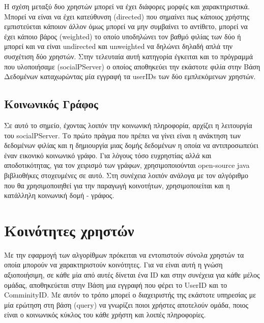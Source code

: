 Η σχέση μεταξύ δυο χρηστών μπορεί να έχει διάφορες μορφές και χαρακτηριστικά. Μπορεί να είναι να έχει κατεύθυνση (directed) που σημαίνει πως κάποιος χρήστης
εμπιστεύεται κάποιον άλλον όμως μπορεί να μην συμβαίνει το αντίθετο, μπορεί να έχει κάποιο βάρος (weighted) το οποίο υποδηλώνει τον βαθμό
φιλίας των δύο ή μπορεί και να είναι undirected και unweighted να δηλώνει δηλαδή απλά την συσχέτιση δύο χρηστών. Στην τελευταία αυτή κατηγορία
έγκειται και το πρόγραμμά που υλοποιήσαμε (socialPServer) ο οποίος αποθηκεύει την εκάστοτε φιλία στην Βάση Δεδομένων καταχωρώντας μία εγγραφή τα userIDs των δύο εμπλεκόμενων χρηστών.


\subsection*{Κοινωνικός Γράφος}
\noindent
Σε αυτό το σημείο, έχοντας λοιπόν την κοινωνική πληροφορία, αρχίζει η λειτουργία του socialPServer. Το πρώτο πράγμα που πρέπει να γίνει
είναι η ανάκτηση των δεδομένων φιλίας και η δημιουργία μιας δομής δεδομένων η οποία να αντιπροσωπεύει έναν εικονικό κοινωνικό γράφο.
Για λόγους τόσο ευχρηστίας αλλά και αποδοτικότητας, για τον χειρισμό των γράφων, χρησιμοποιούνται open-source java βιβλιοθήκες στοχευμένες σε αυτό. Στη συνέχεια λοιπόν
ανάλογα με τον αλγόριθμο που θα χρησιμοποιηθεί για την παραγωγή κοινοτήτων, χρησιμοποιείται και η κατάλληλη κοινωνική δομή - γράφος.



\section{Κοινότητες χρηστών}
\noindent
Με την εφαρμογή των αλγορίθμων πρόκειται να εντοπιστούν σύνολα χρηστών τα οποία μπορούν να χαρακτηριστούν κοινότητες. Για να είναι αυτή η γνώση αξιοποιήσιμη,
σε κάθε μία από αυτές δίνεται ένα ID και στην συνέχεια για κάθε μέλος ομάδας, αποθηκεύεται στην Βάση μια εγγραφή που φέρει το UserID και το ComminityID. Με αυτόν το τρόπο μπορεί ο διαχειριστής της εκάστοτε υπηρεσίας
με μία ερώτηση στη βάση (query) να γνωρίζει ποιοι χρήστες αποτελούν ομάδα, ποιος είναι ο κοινωνικός κύκλος του κάθε χρήστη και λοιπές πληροφορίες.

